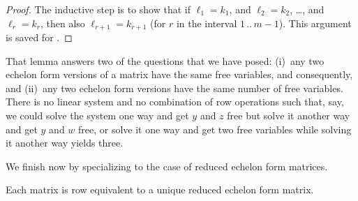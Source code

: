 \begin{proof}
The inductive step is to show that 
if $\ell_1=k_1$, and
$\ell_2=k_2$, \ldots, and $\ell_r=k_r$, then also $\ell_{r+1}=k_{r+1}$
(for $r$ in the interval $1\,..\,m-1$).
This argument is saved for . 
\end{proof}

That lemma answers two of the questions that we have posed: (i)~any
two echelon form versions of a matrix have the same free variables,
and consequently, and (ii)~any two echelon form versions have the same number 
of free variables.
There is no linear system and no combination of row operations such
that, say, we could solve the system 
one way and get $y$ and $z$ free but solve it
another way and get $y$ and $w$ free, or solve it one way and get two free
variables while solving it another way yields three. 

We finish now by specializing to the case of reduced echelon form matrices.

\begin{theorem}
\label{th:ReducedEchelonFormIsUnique}
Each matrix is row equivalent to a unique reduced echelon form matrix.
\end{theorem}

